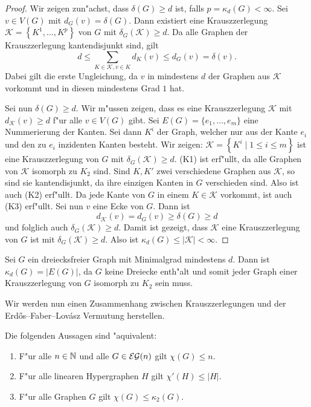 \begin{proof}
  Wir zeigen zun"achst, dass $\delta(G) \geq d$ ist, falls $p = \kappa_d(G) < \infty$. Sei $v\in V(G)$ mit $d_{G}(v) = \delta(G)$. Dann existiert eine Krauszzerlegung $\mathcal{K}=\left\{ K^{1}, \dots , K^{p} \right\}$ von $G$ mit $\delta_{G}(\mathcal{K}) \geq d$. Da alle Graphen der Krauszzerlegung kantendisjunkt sind, gilt $$ d \leq \sum\limits_{K\in \mathcal{K}, v\in K} d_{K}(v) \leq d_{G}(v) = \delta(v).$$
  Dabei gilt die erste Ungleichung, da $v$ in mindestens $d$ der Graphen aus $\mathcal{K}$ vorkommt und in diesen mindestens Grad $1$ hat.

  Sei nun $\delta(G) \geq d$. Wir m"ussen zeigen, dass es eine Krauszzerlegung $\mathcal{K}$ mit
  $d_{\mathcal{K}}(v) \geq d$ f"ur alle $v\in V(G)$ gibt. Sei $E(G)= \{e_1,\dots, e_{m}\}$ eine Nummerierung der Kanten. Sei dann $K^i$ der Graph, welcher nur aus der Kante $e_i$ und den zu $e_i$ inzidenten Kanten besteht. Wir zeigen: $\mathcal{K} = \left\{ K^i \;|\; 1 \leq i \leq m \right\}$ ist eine Krauszzerlegung von $G$ mit $\delta_{G}(\mathcal{K}) \geq d$. (K1) ist erf"ullt, da alle Graphen von $\mathcal{K}$ isomorph zu $K_{2}$ sind. Sind $K,K'$ zwei verschiedene Graphen aus $\mathcal{K}$, so sind sie
  kantendisjunkt, da ihre einzigen Kanten in $G$ verschieden sind. Also ist auch (K2) erf"ullt. Da jede Kante von $G$ in einem $K\in \mathcal{K}$ vorkommt, ist auch (K3) erf"ullt. Sei nun $v$ eine Ecke von $G$. Dann ist $$d_{\mathcal{K}}(v) = d_{G}(v) \geq \delta(G) \geq d$$ und folglich auch $\delta_{G}(\mathcal{K}) \geq d$. Damit ist gezeigt, dass $\mathcal{K}$ eine Krauszzerlegung von $G$ ist mit $\delta_{G}\left( \mathcal{K} \right) \geq d$. Also ist
  $\kappa_{d}(G) \leq |\mathcal{K}| <
  \infty$.
\end{proof}

\begin{example}
  Sei $G$ ein dreiecksfreier Graph mit Minimalgrad mindestens $d$. Dann ist $\kappa_{d}(G) = |E(G)|$, da $G$ keine Dreiecke enth"alt und somit jeder Graph einer Krauszzerlegung von $G$ isomorph zu $K_{2}$ sein muss. 
\end{example}

Wir werden nun einen Zusammenhang zwischen Krauszzerlegungen und der Erd\H{o}s--Faber--Lov\'asz Vermutung herstellen.

\begin{theorem}
  Die folgenden Aussagen sind "aquivalent:
  \begin{enumerate}[label=\rm{(\alph*)}]
    \item F"ur alle $n\in{\mathbb{N}}$ und alle $G\in{\cal EG}(n)$ gilt $\chi(G) \leq n$.
    \item F"ur alle linearen Hypergraphen $H$ gilt $\chi'(H) \leq |H|$.
    \item F"ur alle Graphen $G$ gilt $\chi(G) \leq \kappa_{2}(G)$.
  \end{enumerate}
  \label{thm:equivefl}
\end{theorem}

